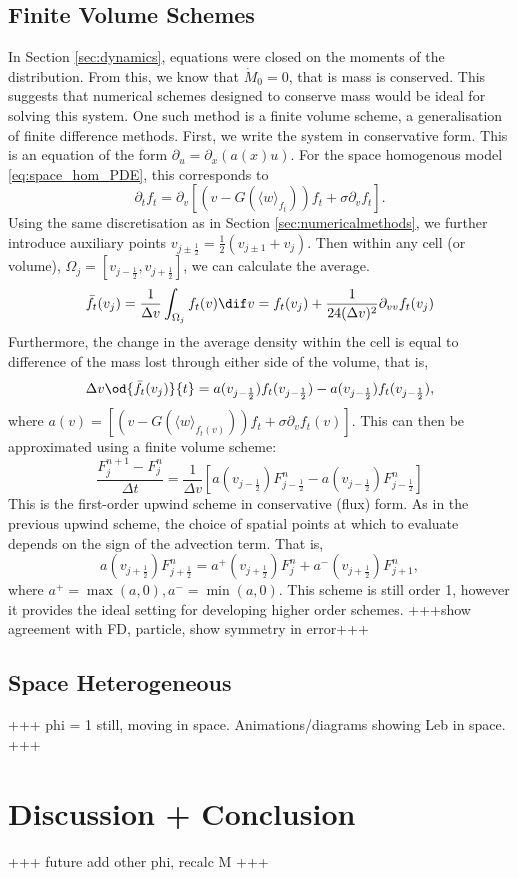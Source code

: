 \documentclass[11pt, a4paper, draft]{article}
\newcommand{\Dt}{\Delta t}
\newcommand{\Dv}{\Delta v}
\begin{document}
        \subsection{Finite Volume Schemes}
            In Section \ref{sec:dynamics}, equations were closed on the moments of the distribution. From this, we know that \(\dot{M}_0 = 0\), that is mass is conserved. This suggests that numerical schemes designed to conserve mass would be ideal for solving this system. One such method is a finite volume scheme, a generalisation of finite difference methods. First, we write the system in conservative form. This is an equation of the form $\partial_ u = \partial_x(a(x)u)$. For the space homogenous model \eqref{eq:space_hom_PDE}, this corresponds to
            \begin{equation}\label{eq:flux_space_hom}
                \partial_t f_t = \partial_v \left[\left(v-G(\langle w \rangle_{f_t})\right)f_t + \sigma \partial_v f_t \right].
            \end{equation}
            Using the same discretisation as in Section \ref{sec:numericalmethods}, we further introduce auxiliary points $v_{j\pm\frac{1}{2}} = \frac{1}{2}(v_{j\pm1} + v_j) $. Then within any cell (or volume), $\Omega_j = [v_{j-\frac{1}{2}}, v_{j+\frac{1}{2}}]$, we can calculate the average.
            \[
                 \bar{f}_t(v_j) = \frac{1}{\Dv}\int_{\Omega_j} f_t(v) \dif v = f_t(v_j)+\frac{1}{24(\Dv)^2} \partial_{vv} f_t(v_j)
             \]
            Furthermore, the change in the average density within the cell is equal to difference of the mass lost through either side of the volume, that is,
            \[
                \Dv\od{\bar{f}_t(v_j)}{t} = a(v_{j-\frac{1}{2}})f_t(v_{j-\frac{1}{2}}) - a(v_{j-\frac{1}{2}})f_t(v_{j-\frac{1}{2}}), 
            \]
            where $a(v) = \left[\left(v-G(\langle w \rangle_{f_t(v)})\right)f_t + \sigma \partial_v f_t(v) \right]$. This can then be approximated using a finite volume scheme:
            \[
                \frac{F^{n+1}_j - F^n_j}{\Dt} = \frac{1}{\Dv}\left[ a(v_{j-\frac{1}{2}})F^n_{j-\frac{1}{2}} - a(v_{j-\frac{1}{2}})F^n_{j-\frac{1}{2}}\right]
            \]
            This is the first-order upwind scheme in conservative (flux) form. As in the previous upwind scheme, the choice of spatial points at which to evaluate depends on the sign of the advection term. That is,
            \[
                a(v_{j+\frac{1}{2}})F^n_{j+\frac{1}{2}} = a^+(v_{j+\frac{1}{2}})F^n_{j} + a^-(v_{j+\frac{1}{2}})F^n_{j+1},
            \]
            where $a^+ = \max(a,0), a^- = \min(a,0)$.  This scheme is still order 1, however it provides the ideal setting for developing higher order schemes.
            +++show agreement with FD, particle,  show symmetry in error+++ 
        \subsection{Space Heterogeneous}
        +++ phi = 1 still, moving in space. Animations/diagrams showing Leb in space. +++
        
        \section{Discussion + Conclusion}
        +++ future add other phi, recalc M +++
	
	
	\appendix
\end{document}
